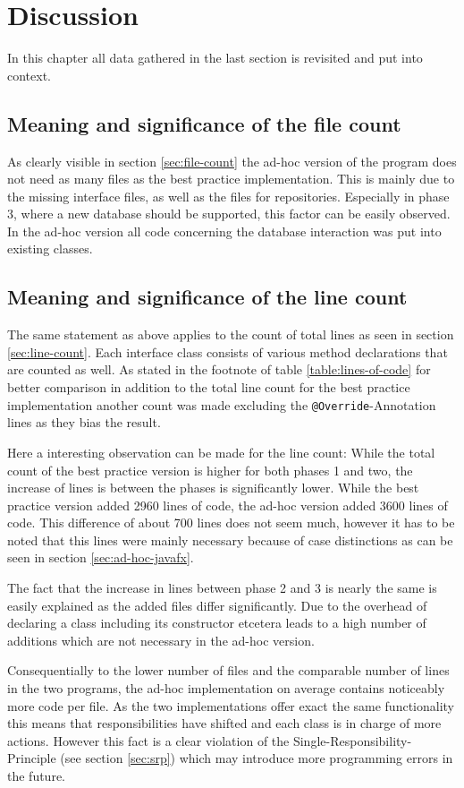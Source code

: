 \chapter{Discussion}
In this chapter all data gathered in the last section is revisited and put into context. 
\section{Meaning and significance of the file count}
As clearly visible in section \ref{sec:file-count} the ad-hoc version of the program does not need as many files as the best practice implementation. This is mainly due to the missing interface files, as well as the files for repositories. Especially in phase 3, where a new database should be supported, this factor can be easily observed. In the ad-hoc version all code concerning the database interaction was put into existing classes. 

\section{Meaning and significance of the line count}
The same statement as above applies to the count of total lines as seen in section \ref{sec:line-count}. Each interface class consists of various method declarations that are counted as well. As stated in the footnote of table \ref{table:lines-of-code} for better comparison in addition to the total line count for the best practice implementation another count was made excluding the \texttt{@Override}-Annotation lines as they bias the result. 

Here a interesting observation can be made for the line count: While the total count of the best practice version is higher for both phases 1 and two, the increase of lines is between the phases is significantly lower. While the best practice version added 2960 lines of code, the ad-hoc version added 3600 lines of code. This difference of about 700 lines does not seem much, however it has to be noted that this lines were mainly necessary because of case distinctions as can be seen in section \ref{sec:ad-hoc-javafx}. 

The fact that the increase in lines between phase 2 and 3 is nearly the same is easily explained as the added files differ significantly. Due to the overhead of declaring a class including its constructor etcetera leads to a high number of additions which are not necessary in the ad-hoc version.

Consequentially to the lower number of files and the comparable number of lines in the two programs, the ad-hoc implementation on average contains noticeably more code per file. As the two implementations offer exact the same functionality this means that responsibilities have shifted and each class is in charge of more actions. However this fact is a clear violation of the Single-Responsibility-Principle (see section \ref{sec:srp}) which may introduce more programming errors in the future. 
